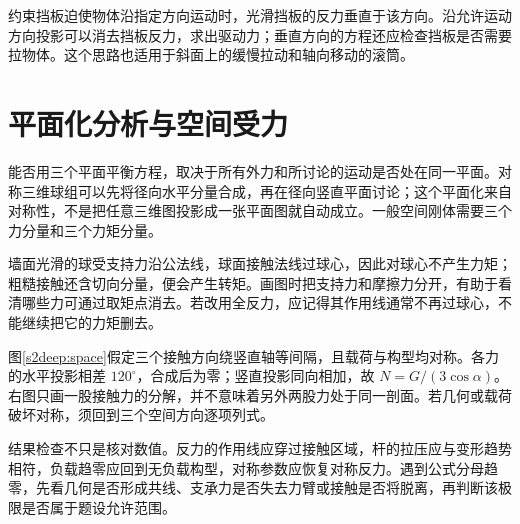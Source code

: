 约束挡板迫使物体沿指定方向运动时，光滑挡板的反力垂直于该方向。沿允许运动方向投影可以消去挡板反力，求出驱动力；垂直方向的方程还应检查挡板是否需要拉物体。这个思路也适用于斜面上的缓慢拉动和轴向移动的滚筒。

\section{平面化分析与空间受力}
能否用三个平面平衡方程，取决于所有外力和所讨论的运动是否处在同一平面。对称三维球组可以先将径向水平分量合成，再在径向竖直平面讨论；这个平面化来自对称性，不是把任意三维图投影成一张平面图就自动成立。一般空间刚体需要三个力分量和三个力矩分量。

墙面光滑的球受支持力沿公法线，球面接触法线过球心，因此对球心不产生力矩；粗糙接触还含切向分量，便会产生转矩。画图时把支持力和摩擦力分开，有助于看清哪些力可通过取矩点消去。若改用全反力，应记得其作用线通常不再过球心，不能继续把它的力矩删去。

图\ref{s2deep:space}假定三个接触方向绕竖直轴等间隔，且载荷与构型均对称。各力的水平投影相差 $120^\circ$，合成后为零；竖直投影同向相加，故 $N=G/(3\cos\alpha)$。右图只画一股接触力的分解，并不意味着另外两股力处于同一剖面。若几何或载荷破坏对称，须回到三个空间方向逐项列式。

结果检查不只是核对数值。反力的作用线应穿过接触区域，杆的拉压应与变形趋势相符，负载趋零应回到无负载构型，对称参数应恢复对称反力。遇到公式分母趋零，先看几何是否形成共线、支承力是否失去力臂或接触是否将脱离，再判断该极限是否属于题设允许范围。

